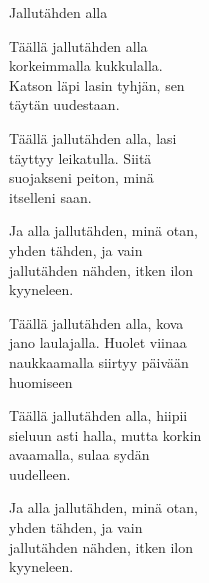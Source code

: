 \begin{song}{Jallutähden alla}


    Täällä jallutähden alla\\
    korkeimmalla kukkulalla.\\
    Katson läpi lasin tyhjän, sen\\
    täytän uudestaan.

    Täällä jallutähden alla, lasi\\
    täyttyy leikatulla. Siitä\\
    suojakseni peiton, minä\\
    itselleni saan.

    Ja alla jallutähden, minä otan,\\
    yhden tähden, ja vain\\
    jallutähden nähden, itken ilon\\
    kyyneleen.

    Täällä jallutähden alla, kova\\
    jano laulajalla. Huolet viinaa\\
    naukkaamalla siirtyy päivään\\
    huomiseen

    Täällä jallutähden alla, hiipii\\
    sieluun asti halla, mutta korkin\\
    avaamalla, sulaa sydän\\
    uudelleen.

    Ja alla jallutähden, minä otan,\\
    yhden tähden, ja vain\\
    jallutähden nähden, itken ilon\\
    kyyneleen.

\end{song}